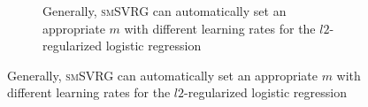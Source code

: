\documentclass[conference]{IEEEtran}
\begin{document}
\begin{itemize}
\begin{figure}[ht]
\begin{figure}[ht]
\centering
{}

\caption{Generally, \textsc{smSVRG} can automatically set an appropriate $m$ with different learning rates for the $l2$-regularized logistic regression}
\label{figure_logistic_a9a}
\end{figure}


\end{figure}
\end{itemize}
\end{document}
